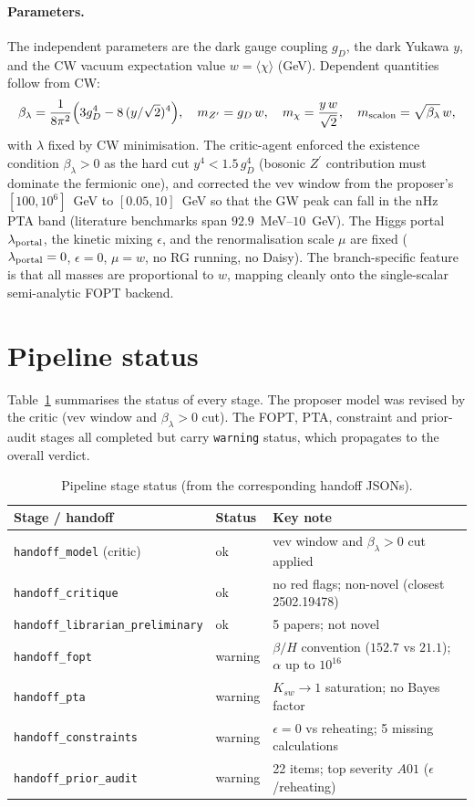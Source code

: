 \documentclass[11pt]{article}
\newcommand{\Zp}{Z^{\prime}}
\newcommand{\gD}{g_{D}}
\newcommand{\mZp}{m_{\Zp}}
\newcommand{\betaH}{\beta/H}
\begin{document}
\paragraph{Parameters.}
The independent parameters are the dark gauge coupling $\gD$, the dark Yukawa $y$, and the
CW vacuum expectation value $w=\langle\chi\rangle$ (GeV). Dependent quantities follow from CW:
\begin{equation}
\beta_\lambda=\frac{1}{8\pi^2}\Big(3\gD^4-8\,(y/\sqrt2)^4\Big),\quad
\mZp=\gD\,w,\quad
m_\chi=\frac{y\,w}{\sqrt2},\quad
m_{\rm scalon}=\sqrt{\beta_\lambda}\,w,
\end{equation}
with $\lambda$ fixed by CW minimisation. The critic-agent enforced the existence
condition $\beta_\lambda>0$ as the hard cut $y^4<1.5\,\gD^4$ (bosonic $\Zp$ contribution
must dominate the fermionic one), and corrected the vev window from the proposer's
$[100,10^6]$~GeV to $[0.05,10]$~GeV so that the GW peak can fall in the nHz PTA band
(literature benchmarks span $92.9$~MeV--$10$~GeV). The Higgs portal $\lambda_{\rm portal}$,
the kinetic mixing $\epsilon$, and the renormalisation scale $\mu$ are fixed
($\lambda_{\rm portal}=0$, $\epsilon=0$, $\mu=w$, no RG running, no Daisy). The branch-specific
feature is that all masses are proportional to $w$, mapping cleanly onto the
single-scalar semi-analytic FOPT backend.

\section{Pipeline status}
\label{sec:status}
Table~\ref{tab:status} summarises the status of every stage. The proposer model was
revised by the critic (vev window and $\beta_\lambda>0$ cut). The FOPT, PTA, constraint
and prior-audit stages all completed but carry \texttt{warning} status, which propagates
to the overall verdict.

\begin{table}[h]
\centering
\small
\caption{Pipeline stage status (from the corresponding handoff JSONs).}
\label{tab:status}
\begin{tabular}{lll}
\toprule
Stage / handoff & Status & Key note \\
\midrule
\texttt{handoff\_model} (critic) & ok & vev window and $\beta_\lambda>0$ cut applied \\
\texttt{handoff\_critique}       & ok & no red flags; non-novel (closest 2502.19478) \\
\texttt{handoff\_librarian\_preliminary} & ok & 5 papers; not novel \\
\texttt{handoff\_fopt}           & warning & $\betaH$ convention ($152.7$ vs $21.1$); $\alpha$ up to $10^{16}$ \\
\texttt{handoff\_pta}            & warning & $K_{sw}\to1$ saturation; no Bayes factor \\
\texttt{handoff\_constraints}    & warning & $\epsilon=0$ vs reheating; 5 missing calculations \\
\texttt{handoff\_prior\_audit}   & warning & 22 items; top severity $A01$ ($\epsilon$/reheating) \\
\bottomrule
\end{tabular}
\end{table}
\end{document}
